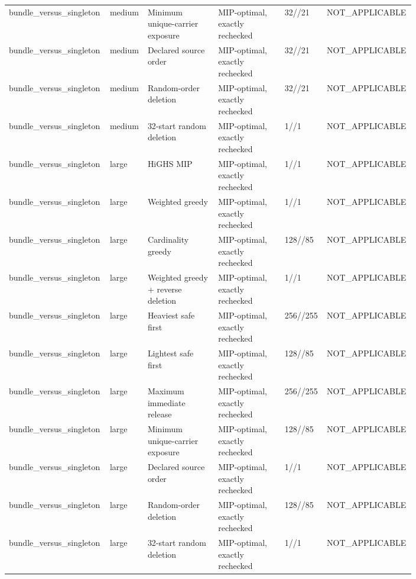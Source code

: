 {\begin{longtable}{p{0.18\linewidth}p{0.07\linewidth}p{0.17\linewidth}p{0.16\linewidth}p{0.10\linewidth}p{0.12\linewidth}}
bundle\_versus\_singleton & medium & Minimum unique-carrier exposure & MIP-optimal, exactly rechecked & 32//21 & NOT\_APPLICABLE \\
bundle\_versus\_singleton & medium & Declared source order & MIP-optimal, exactly rechecked & 32//21 & NOT\_APPLICABLE \\
bundle\_versus\_singleton & medium & Random-order deletion & MIP-optimal, exactly rechecked & 32//21 & NOT\_APPLICABLE \\
bundle\_versus\_singleton & medium & 32-start random deletion & MIP-optimal, exactly rechecked & 1//1 & NOT\_APPLICABLE \\
bundle\_versus\_singleton & large & HiGHS MIP & MIP-optimal, exactly rechecked & 1//1 & NOT\_APPLICABLE \\
bundle\_versus\_singleton & large & Weighted greedy & MIP-optimal, exactly rechecked & 1//1 & NOT\_APPLICABLE \\
bundle\_versus\_singleton & large & Cardinality greedy & MIP-optimal, exactly rechecked & 128//85 & NOT\_APPLICABLE \\
bundle\_versus\_singleton & large & Weighted greedy + reverse deletion & MIP-optimal, exactly rechecked & 1//1 & NOT\_APPLICABLE \\
bundle\_versus\_singleton & large & Heaviest safe first & MIP-optimal, exactly rechecked & 256//255 & NOT\_APPLICABLE \\
bundle\_versus\_singleton & large & Lightest safe first & MIP-optimal, exactly rechecked & 128//85 & NOT\_APPLICABLE \\
bundle\_versus\_singleton & large & Maximum immediate release & MIP-optimal, exactly rechecked & 256//255 & NOT\_APPLICABLE \\
bundle\_versus\_singleton & large & Minimum unique-carrier exposure & MIP-optimal, exactly rechecked & 128//85 & NOT\_APPLICABLE \\
bundle\_versus\_singleton & large & Declared source order & MIP-optimal, exactly rechecked & 1//1 & NOT\_APPLICABLE \\
bundle\_versus\_singleton & large & Random-order deletion & MIP-optimal, exactly rechecked & 128//85 & NOT\_APPLICABLE \\
bundle\_versus\_singleton & large & 32-start random deletion & MIP-optimal, exactly rechecked & 1//1 & NOT\_APPLICABLE \\
\bottomrule
\end{longtable}
}
